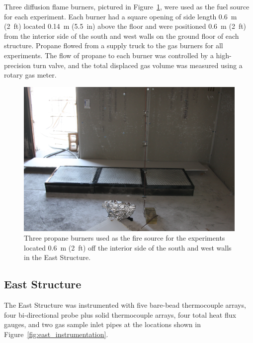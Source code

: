 Three diffusion flame burners, pictured in Figure~\ref{fig:burners}, were used as the fuel source for each experiment. Each burner had a square opening of side length 0.6~m (2~ft) located 0.14~m (5.5~in) above the floor and were positioned 0.6~m (2~ft) from the interior side of the south and west walls on the ground floor of each structure. Propane flowed from a supply truck to the gas burners for all experiments. The flow of propane to each burner was controlled by a high-precision turn valve, and the total displaced gas volume was measured using a rotary gas meter.

\begin{figure}[!h]
	\centering
	\includegraphics[width=0.9\columnwidth]{Figures/Pictures/burners}
	\caption[Three propane burners used as the fuel source.]{Three propane burners used as the fire source for the experiments located 0.6~m (2~ft) off the interior side of the south and west walls in the East Structure.}
	\label{fig:burners}
\end{figure}
\FloatBarrier

\subsection{East Structure}
The East Structure was instrumented with five bare-bead thermocouple arrays, four bi-directional probe plus solid thermocouple arrays, four total heat flux gauges, and two gas sample inlet pipes at the locations shown in Figure~\ref{fig:east_instrumentation}.


